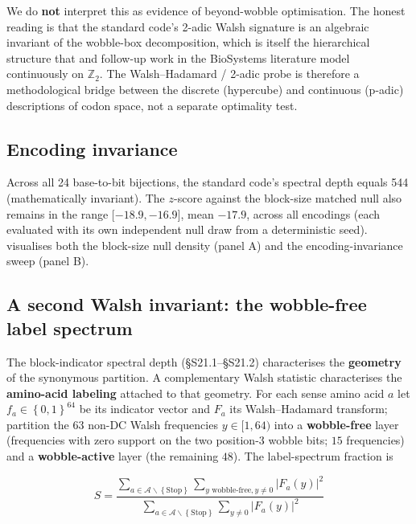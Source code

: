 \documentclass[preprint,11pt,authoryear,a4paper]{elsarticle}
\begin{document}
We do \textbf{not} interpret this as evidence of beyond-wobble
optimisation. The honest reading is that the standard code's 2-adic
Walsh signature is an algebraic invariant of the wobble-box
decomposition, which is itself the hierarchical structure that
\citep{khrennikov2007} and follow-up work in the BioSystems literature
model continuously on \(\mathbb{Z}_{2}\). The Walsh--Hadamard / 2-adic
probe is therefore a methodological bridge between the discrete
(hypercube) and continuous (p-adic) descriptions of codon space, not a
separate optimality test.

\subsection{Encoding invariance}

Across all 24 base-to-bit bijections, the standard code's spectral depth
equals 544 (mathematically invariant). The \(z\)-score against the
block-size matched null also remains in the range
\(\lbrack - 18.9, - 16.9\rbrack\), mean \(- 17.9\), across all encodings
(each evaluated with its own independent null draw from a deterministic
seed).  visualises both the block-size null
density (panel A) and the encoding-invariance sweep (panel B).

\subsection{A second Walsh invariant: the wobble-free label spectrum}

The block-indicator spectral depth (§S21.1--§S21.2) characterises the
\textbf{geometry} of the synonymous partition. A complementary Walsh
statistic characterises the \textbf{amino-acid labeling} attached to
that geometry. For each sense amino acid \(a\) let
\(f_{a} \in \left\{ 0,1 \right\}^{64}\) be its indicator vector and
\(F_{a}\) its Walsh--Hadamard transform; partition the \(63\) non-DC
Walsh frequencies \(y \in \lbrack 1,64)\) into a \textbf{wobble-free}
layer (frequencies with zero support on the two position-3 wobble bits;
\(15\) frequencies) and a \textbf{wobble-active} layer (the remaining
\(48\)). The label-spectrum fraction is

\[S = \frac{\sum_{a \in \mathcal{A}\backslash\left\{ \text{Stop} \right\}}\sum_{y\text{ wobble-free},y \neq 0}\left| {F_{a}(y)} \right|^{2}}{\sum_{a \in \mathcal{A}\backslash\left\{ \text{Stop} \right\}}\sum_{y \neq 0}\left| {F_{a}(y)} \right|^{2}}\]
\protect{}\label{eq:S_label}{}
\end{document}
